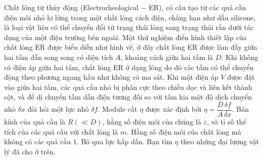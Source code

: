 \begin{vd}
\begin{center}
\end{center}
Chất lỏng từ thủy động (Electrorheological $-$ ER), có cấu tạo từ các quả cầu điện môi nhỏ lơ lửng trong một chất lỏng cách điện, chẳng hạn như dầu silicone, là loại vật liệu có thể chuyển đổi từ trạng thái lỏng sang trạng thái rắn dưới tác dụng của một điện trường bên ngoài. Một thử nghiệm điển hình thiết lập của chất lỏng ER được biểu diễn như hình vẽ, ở đây chất lỏng ER được làm đầy giữa hai tấm dẫn song song có diện tích $A$, khoảng cách giữa hai tấm là $D$. Khi không có điện áp giữa hai tấm, chất lỏng ER ở dạng lỏng do đó các tấm có thể chuyển động theo phương ngang hầu như không có ma sát. Khi một điện áp $V$ được đặt vào giữa hai tấm, các quả cầu nhỏ bị phân cực theo chiều dọc và liên kết thành cột, và để di chuyển tấm dẫn điện tương đối so với tấm kia một độ dịch chuyển nhỏ $\delta x$ đòi hỏi một lực nhỏ $\delta f$. Module cắt $\eta$ được xác định bởi $\eta=\dfrac{D}{A}\dfrac{\delta f}{\delta x}$. Bán kính của quả cầu là $R(\ll D)$, hằng số điện môi của chúng là $\varepsilon$, và tỉ số thể tích của các quả cầu với chất lỏng là $m$. Hằng số điện môi của chất lỏng mà không có các quả cầu $1$. Bỏ qua lực hấp dẫn. Bạn tìm $\eta$ theo những đại lượng vật lý đã cho ở trên.
\begin{center}
  

\end{center}
\end{vd}
